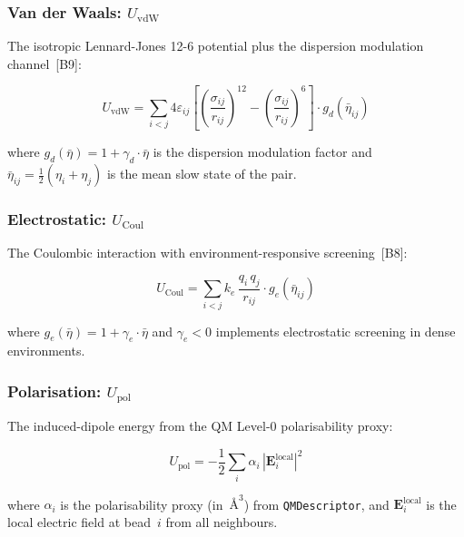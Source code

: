 \documentclass[11pt, a4paper, oneside]{article}
\newcommand{\type}[1]{\texttt{#1}}
\newcommand{\Ang}{\text{\AA}}
\begin{document}
\subsubsection{Van der Waals:
  \texorpdfstring{$U_{\mathrm{vdW}}$}{U\_vdW}}

The isotropic Lennard-Jones 12-6 potential plus the
dispersion modulation channel~[B9]:

\begin{equation}
U_{\mathrm{vdW}} = \sum_{i < j}
  4\varepsilon_{ij}\left[
    \left(\frac{\sigma_{ij}}{r_{ij}}\right)^{\!12}
  - \left(\frac{\sigma_{ij}}{r_{ij}}\right)^{\!6}
  \right]
  \cdot g_d(\bar\eta_{ij})
\label{eq:UvdW}
\end{equation}

where $g_d(\bar\eta) = 1 + \gamma_d \cdot \bar\eta$ is the dispersion
modulation factor and $\bar\eta_{ij} = \tfrac{1}{2}(\eta_i + \eta_j)$
is the mean slow state of the pair.

\subsubsection{Electrostatic:
  \texorpdfstring{$U_{\mathrm{Coul}}$}{U\_Coul}}

The Coulombic interaction with environment-responsive screening~[B8]:

\begin{equation}
U_{\mathrm{Coul}} = \sum_{i < j}
  k_e\,\frac{q_i\,q_j}{r_{ij}}
  \cdot g_e(\bar\eta_{ij})
\label{eq:UCoul}
\end{equation}

where $g_e(\bar\eta) = 1 + \gamma_e \cdot \bar\eta$ and
$\gamma_e < 0$ implements electrostatic screening in dense
environments.

\subsubsection{Polarisation:
  \texorpdfstring{$U_{\mathrm{pol}}$}{U\_pol}}

The induced-dipole energy from the QM Level-0 polarisability proxy:

\begin{equation}
U_{\mathrm{pol}} = -\frac{1}{2}\sum_i \alpha_i\,|\mathbf{E}_i^{\mathrm{local}}|^2
\label{eq:Upol}
\end{equation}

where $\alpha_i$ is the polarisability proxy (in~$\Ang^3$) from
\type{QMDescriptor}, and $\mathbf{E}_i^{\mathrm{local}}$ is the
local electric field at bead~$i$ from all neighbours.
\end{document}
